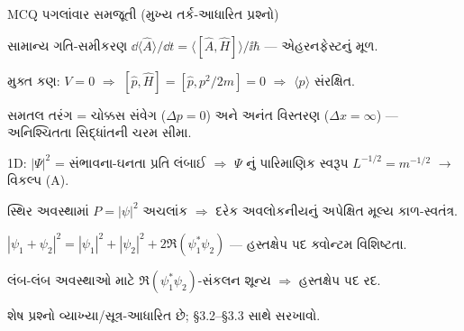 \begin{javabchavi}{MCQ પગલાંવાર સમજૂતી (મુખ્ય તર્ક-આધારિત પ્રશ્નો)}
\begin{description}[style=nextline,itemsep=0pt]
  \item[21.] સામાન્ય ગતિ-સમીકરણ $\dd\langle\hat A\rangle/\dd t=\langle[\hat A,\hat H]\rangle/\ii\hbar$ — એહરનફેસ્ટનું મૂળ.
  \item[22.] મુક્ત કણ: $V=0$ $\Rightarrow$ $[\hat p,\hat H]=[\hat p,p^2/2m]=0$ $\Rightarrow$ $\langle p\rangle$ સંરક્ષિત.
  \item[23./24.] સમતલ તરંગ = ચોક્કસ સંવેગ ($\Delta p=0$) અને અનંત વિસ્તરણ ($\Delta x=\infty$) — અનિશ્ચિતતા સિદ્ધાંતની ચરમ સીમા.
  \item[33.] 1D: $|\Psi|^{2}$ = સંભાવના-ઘનતા પ્રતિ લંબાઈ $\Rightarrow$ $\Psi$ નું પારિમાણિક સ્વરૂપ $L^{-1/2}=m^{-1/2}$ $\to$ વિકલ્પ (A).
  \item[37.] સ્થિર અવસ્થામાં $P=|\psi|^{2}$ અચલાંક $\Rightarrow$ દરેક અવલોકનીયનું અપેક્ષિત મૂલ્ય કાળ-સ્વતંત્ર.
  \item[38.] $|\psi_1+\psi_2|^{2}=|\psi_1|^{2}+|\psi_2|^{2}+2\Re(\psi_1^{*}\psi_2)$ — હસ્તક્ષેપ પદ ક્વોન્ટમ વિશિષ્ટતા.
  \item[50.] લંબ-લંબ અવસ્થાઓ માટે $\Re(\psi_1^{*}\psi_2)$-સંકલન શૂન્ય $\Rightarrow$ હસ્તક્ષેપ પદ રદ.
\end{description}
શેષ પ્રશ્નો વ્યાખ્યા/સૂત્ર-આધારિત છે; \S3.2--\S3.3 સાથે સરખાવો.
\end{javabchavi}
